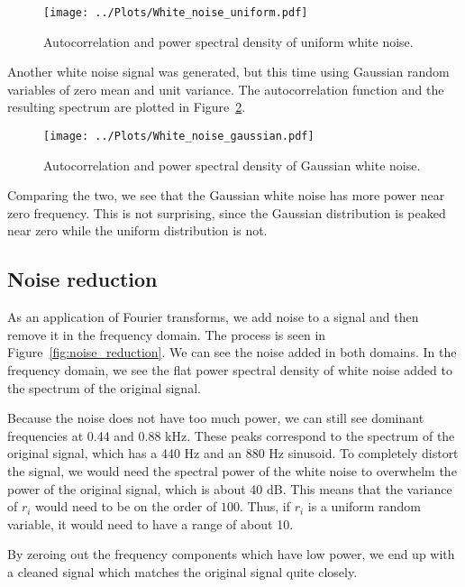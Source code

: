 \documentclass[twocolumn]{myarticle}
\begin{document}
\begin{figure}[htpb]
    \centering
    \texttt{[image: ../Plots/White\_noise\_uniform.pdf]}
    \caption{Autocorrelation and power spectral density of uniform white noise.}
    \label{fig:white_noise_uniform}
\end{figure}

Another white noise signal was generated, but this time using Gaussian random variables of zero mean and unit variance.
The autocorrelation function and the resulting spectrum are plotted in Figure~\ref{fig:white_noise_gaussian}.

\begin{figure}[htpb]
    \centering
    \texttt{[image: ../Plots/White\_noise\_gaussian.pdf]}
    \caption{Autocorrelation and power spectral density of Gaussian white noise.}
    \label{fig:white_noise_gaussian}
\end{figure}

Comparing the two, we see that the Gaussian white noise has more power near zero frequency.
This is not surprising, since the Gaussian distribution is peaked near zero while the uniform distribution is not.

\subsection{Noise reduction}
\label{subsec:noise_reduction}

As an application of Fourier transforms, we add noise to a signal and then remove it in the frequency domain.
The process is seen in Figure~\ref{fig:noise_reduction}.
We can see the noise added in both domains.
In the frequency domain, we see the flat power spectral density of white noise added to the spectrum of the original signal.

Because the noise does not have too much power, we can still see dominant frequencies at 0.44 and 0.88 kHz.
These peaks correspond to the spectrum of the original signal, which has a 440 Hz and an 880 Hz sinusoid.
To completely distort the signal, we would need the spectral power of the white noise to overwhelm the power of the original signal, which is about 40 dB.
This means that the variance of $ r_i $ would need to be on the order of $ 100 $.
Thus, if $ r_i $ is a uniform random variable, it would need to have a range of about 10.

By zeroing out the frequency components which have low power, we end up with a cleaned signal which matches the original signal quite closely.
\end{document}
